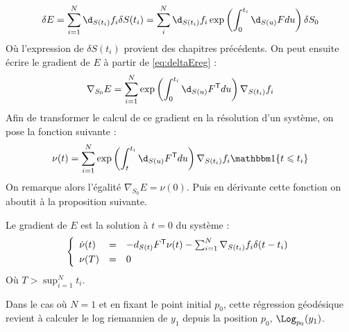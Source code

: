 \begin{equation}
	\label{eq:deltaEreg}
	\delta E = \sum_{i=1}^N \d_{S(t_i)} f_i \delta S(t_i) = \sum_{i}^N \d_{S(t_i)} f_i \exp \left( \int_0^{t_i} \d_{S(u)} F du \right) \delta S_0
\end{equation}
Où l'expression de $\delta S(t_i)$ provient des chapitres précédents. On peut ensuite écrire le gradient de $E$ à partir de \eqref{eq:deltaEreg} :
\begin{equation}
	\nabla_{S_0} E = \sum_{i=1}^N \exp \left( \int_0^{t_i} \d_{S(u)} F^\trans du \right) \nabla_{S(t_i)} f_i
\end{equation}
Afin de transformer le calcul de ce gradient en la résolution d'un système, on pose la fonction suivante :
\begin{equation}
	\nu(t) = \sum_{i=1}^N \exp \left( \int_t^{t_i} \d_{S(u)} F^\trans du \right) \nabla_{S(t_i)} f_i \ind \{ t \leqslant t_i \}
\end{equation}
On remarque alors l'égalité $\nabla_{S_0} E = \nu(0)$. Puis en dérivante cette fonction on aboutit à la proposition suivante.

\begin{proposition}
	Le gradient de $E$ est la solution à $t=0$ du système :
	\begin{equation}
		\syst{lll}{
			\dot{\nu}(t) & = & - d_{S(t)} F^\trans \nu(t) - \sum_{i=1}^N \nabla_{S(t_i)} f_i \delta (t - t_i) \\[1mm]
			\nu(T) & = & 0
		}
	\end{equation}
	Où $T > \sup_{i = 1}^N t_i$.
\end{proposition}

\begin{remarque}
	Dans le cas où $N=1$ et en fixant le point initial $p_0$, cette régression géodésique revient à calculer le log riemannien de $y_1$ depuis la position $p_0$, $\Log_{p_0}(y_1)$.
\end{remarque}

